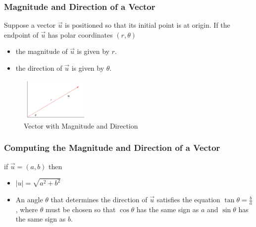 \documentclass{beamer}
\begin{document}
\begin{frame}
    \frametitle{Magnitude and Direction of a Vector}
    Suppose a vector \(\vec{u}\) is positioned so that its initial point is at origin. If the endpoint of \(\vec{u}\) has polar coordinates \((r, \theta)\)
    \begin{itemize}
        \item the magnitude of \(\vec{u}\) is given by \(r\).
        \item the direction of \(\vec{u}\) is given by \(\theta\).
    \end{itemize}
    \begin{figure}
        \centering
        \includegraphics[width=0.3\textwidth]{vector2.png}
        \caption{Vector with Magnitude and Direction}
        \label{fig:vector_magnitude_direction}
    \end{figure}
\end{frame}

\begin{frame}
    \frametitle{Computing the Magnitude and Direction of a Vector}
    if \(\vec u = (a,b)\) then 
    \begin{itemize}
        \item \(|u| = \sqrt{a^2 + b^2}\)
        \item An angle \(\theta\) that determines the direction of \(\vec{u}\) satisfies the equation \(\tan \theta = \frac{b}{a}\), where \(\theta\) must be chosen so that \(\cos \theta\) has the same sign as \(a\) and \(\sin \theta\) has the same sign as \(b\).
    \end{itemize} 
\end{frame}
\end{document}

